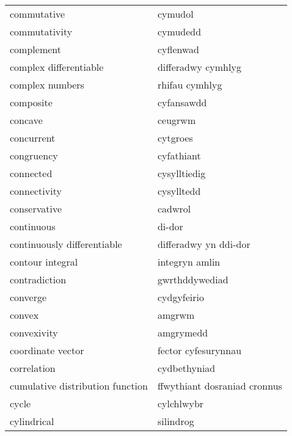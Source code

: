 \begin{supertabular}{p{0.22\textwidth}p{0.22\textwidth}}
                     commutative &                         cymudol \\
                   commutativity &                        cymudedd \\
                      complement &                       cyflenwad \\
          complex differentiable &              differadwy cymhlyg \\
                 complex numbers &                  rhifau cymhlyg \\
                       composite &                      cyfansawdd \\
                         concave &                         ceugrwm \\
                      concurrent &                        cytgroes \\
                      congruency &                      cyfathiant \\
                       connected &                    cysylltiedig \\
                    connectivity &                      cysylltedd \\
                    conservative &                         cadwrol \\
                      continuous &                          di-dor \\
     continuously differentiable &           differadwy yn ddi-dor \\
                contour integral &                  integryn amlin \\
                   contradiction &                  gwrthddywediad \\
                        converge &                     cydgyfeirio \\
                          convex &                          amgrwm \\
                     convexivity &                       amgrymedd \\
               coordinate vector &             fector cyfesurynnau \\
                     correlation &                    cydbethyniad \\
cumulative distribution function &    ffwythiant dosraniad cronnus \\
                           cycle &                      cylchlwybr \\
                     cylindrical &                       silindrog \\

\end{supertabular}
